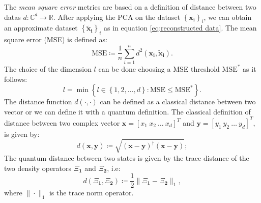 \documentclass[%
    twoside, 
    a4paper
    ]{article}
\begin{document}
        The \emph{mean square error} metrics are based on a definition of distance between
        two datas $d: \mathbb{C}^d \to \mathbb{R}$. 
        After applying the PCA on the dataset $\left\{ \bm{x_i} \right\}_i$, we can obtain
        an approximate dataset $\left\{ \bm{\tilde{x}_i} \right\}_i$ as in equation 
        \ref{eq:reconstructed data}. The mean square error (MSE) is defined as:
        \begin{equation}
            \label{eq:MSE}
            \mathrm{MSE} \coloneqq \frac{1}{n} \sum_{i=1}^n d^2(\bm{x_i},\bm{\tilde{x}_i}).
        \end{equation}
        The choice of the dimension $l$ can be done choosing a MSE threshold 
        $\mathrm{MSE}^*$ as it follows:
        \begin{equation}
            \label{eq:MSEMetric}
            l = \min \left\{ l \in \left\{ 1,2,\dots,d \right\}: 
            \mathrm{MSE} \leq \mathrm{MSE}^* \right\}.
        \end{equation}
        The distance function $d(\cdot,\cdot)$ can be defined as a classical distance 
        between two vector or we can define it with a quantum definition.
        The classical definition of distance between two complex vector 
        $\bm{x} = \left[ x_1\ x_2\ \dots\ x_d \right]^{T}$ and 
        $\bm{y} = \left[ y_1\ y_2\ \dots\ y_d \right]^{T}$, is given by:
        \begin{equation}
            \label{eq:classicalDistance}
            d(\bm{x}, \bm{y}) \coloneqq \sqrt{\left( \bm{x} - \bm{y} \right)^{\dagger}
             \left( \bm{x} - \bm{y} \right)};
        \end{equation}
        The quantum distance between two states is given by the trace distance 
        \cite{10.5555/1972505} of the two 
        density operators $\bm{\varXi_1}$ and $\bm{\varXi_2}$, i.e:
        \begin{equation}
            \label{eq:traceDistance}
            d(\bm{\varXi_1},\bm{\varXi_2}) \coloneqq \frac{1}{2} \| \bm{\varXi_1} 
            -\bm{\varXi_2} \|_1,
        \end{equation}
        where $\| \cdot \|_1$ is the trace norm operator.
\end{document}
